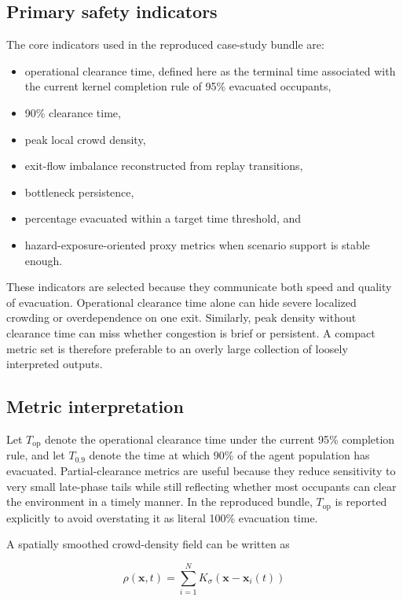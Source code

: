 \documentclass[conference]{IEEEtran}
\begin{document}
\subsection{Primary safety indicators}
The core indicators used in the reproduced case-study bundle are:
\begin{itemize}
    \item operational clearance time, defined here as the terminal time associated with the current kernel completion rule of 95\% evacuated occupants,
    \item 90\% clearance time,
    \item peak local crowd density,
    \item exit-flow imbalance reconstructed from replay transitions,
    \item bottleneck persistence,
    \item percentage evacuated within a target time threshold, and
    \item hazard-exposure-oriented proxy metrics when scenario support is stable enough.
\end{itemize}

These indicators are selected because they communicate both speed and quality of evacuation. Operational clearance time alone can hide severe localized crowding or overdependence on one exit. Similarly, peak density without clearance time can miss whether congestion is brief or persistent. A compact metric set is therefore preferable to an overly large collection of loosely interpreted outputs.

\subsection{Metric interpretation}

Let $T_{\text{op}}$ denote the operational clearance time under the current 95\% completion rule, and let $T_{0.9}$ denote the time at which 90\% of the agent population has evacuated. Partial-clearance metrics are useful because they reduce sensitivity to very small late-phase tails while still reflecting whether most occupants can clear the environment in a timely manner. In the reproduced bundle, $T_{\text{op}}$ is reported explicitly to avoid overstating it as literal 100\% evacuation time.

A spatially smoothed crowd-density field can be written as

\begin{equation}
\rho(\mathbf{x},t) = \sum_{i=1}^{N} K_{\sigma}\left(\mathbf{x} - \mathbf{x}_i(t)\right)
\label{eq:density}
\end{equation}
\end{document}
